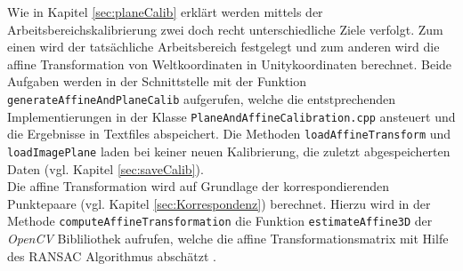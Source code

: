 Wie in Kapitel \ref{sec:planeCalib} erklärt werden mittels der Arbeitsbereichskalibrierung zwei doch recht unterschiedliche Ziele verfolgt. Zum einen wird der tatsächliche Arbeitsbereich festgelegt und zum anderen wird die affine Transformation von Weltkoordinaten in Unitykoordinaten berechnet. Beide Aufgaben werden in der Schnittstelle mit der Funktion \texttt{generateAffineAndPlaneCalib} aufgerufen, welche die entstprechenden Implementierungen in der Klasse \texttt{PlaneAndAffineCalibration.cpp} ansteuert und die Ergebnisse in Textfiles abspeichert. Die Methoden \texttt{loadAffineTransform} und \texttt{loadImagePlane} laden bei keiner neuen Kalibrierung, die zuletzt abgespeicherten Daten (vgl. Kapitel \ref{sec:saveCalib}). \\

Die affine Transformation wird auf Grundlage der korrespondierenden Punktepaare (vgl. Kapitel \ref{sec:Korrespondenz}) berechnet. Hierzu wird in der Methode \texttt{computeAffineTransformation} die Funktion \texttt{estimateAffine3D} der \textit{OpenCV} Bibliliothek aufrufen, welche die affine Transformationsmatrix mit Hilfe des RANSAC Algorithmus abschätzt \cite{articel:RANSAC}.

